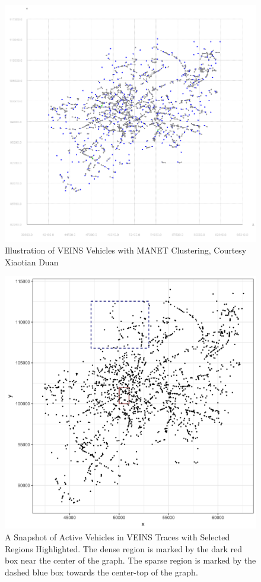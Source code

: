 \documentclass{thesis}
\begin{document}
    \begin{figure}
        \centering
        \includegraphics[scale=.5]{binImages/xiaotian-clusters.png}
        \caption{Illustration of VEINS Vehicles with MANET Clustering, Courtesy Xiaotian Duan}
        \label{fig:clusters}
    \end{figure}
    \begin{figure}
        \centering
        \includegraphics[scale=.2]{binImages/cars.png}
        \caption{A Snapshot of Active Vehicles in VEINS Traces with Selected Regions Highlighted.
                The dense region is marked by the dark red box near the center of the graph. The
                sparse region is marked by the dashed blue box towards the center-top of the graph.}
        \label{fig:regions}
    \end{figure}
\end{document}
